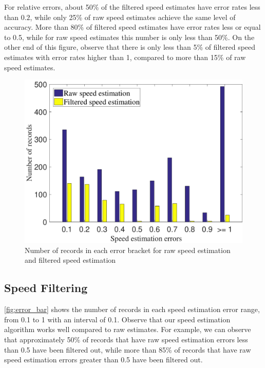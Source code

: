  For relative errors, about 50\% of the filtered speed estimates have error rates less than $0.2$, while only 25\% of raw speed estimates achieve the same level of accuracy. More than 80\% of filtered speed estimates have error rates less or equal to 0.5, while for raw speed estimates this number is only less than 50\%. On the other end of this figure, observe that there is only less than 5\% of filtered speed estimates with error rates higher than 1, compared to more than 15\% of raw speed estimates.


\begin{figure}[h]
    \centering
    \includegraphics[width=0.5\linewidth]{./figures/error_bar.pdf}
    \caption{Number of records in each error bracket for raw speed estimation and filtered speed estimation}
    \label{fig:error_bar}
\end{figure}


\subsection{Speed Filtering}

\autoref{fig:error_bar} shows the number of records in each speed estimation error range, from 0.1 to 1 with an interval of 0.1. Observe that our speed estimation algorithm works well compared to raw estimates. For example, we can observe that approximately 50\% of records that have raw speed estimation errors less than 0.5 have been filtered out, while more than 85\% of records that have raw speed estimation errors greater than 0.5 have been filtered out.
